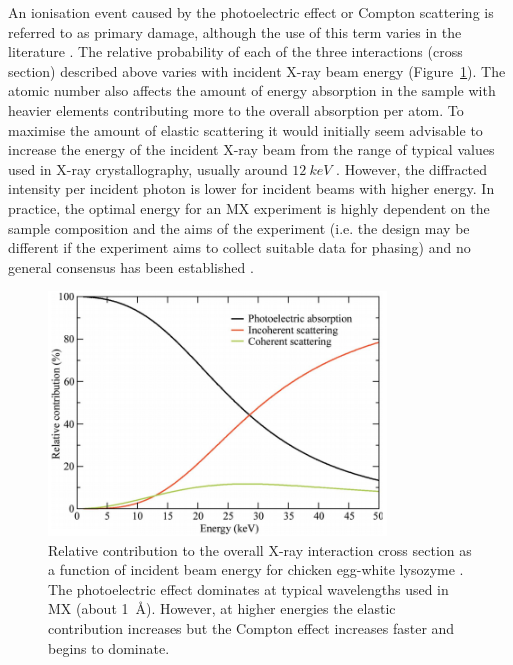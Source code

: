         An ionisation event caused by the photoelectric effect or Compton scattering is referred to as primary damage, although the use of this term varies in the literature \cite{garman2010}.
        The relative probability of each of the three interactions (cross section) described above varies with incident X-ray beam energy (Figure~\ref{fig:Relative Absorption Probabilities}).
        The atomic number also affects the amount of energy absorption in the sample with heavier elements contributing more to the overall absorption per atom.
        To maximise the amount of elastic scattering it would initially seem advisable to increase the energy of the incident X-ray beam from the range of typical values used in X-ray crystallography, usually around $12\ keV$ \cite{pait2010}.
        However, the diffracted intensity per incident photon is lower for incident beams with higher energy.
        In practice, the optimal energy for an MX experiment is highly dependent on the sample composition and the aims of the experiment (i.e. the design may be different if the experiment aims to collect suitable data for phasing) and no general consensus has been established \cite{pait2010}.
        \begin{figure}
            \centering
            \includegraphics[width=0.8\textwidth]{figures/introduction/relativeinteractions.png}
            \caption{Relative contribution to the overall X-ray interaction cross section as a function of incident beam energy for chicken egg-white lysozyme \cite{pait2010}.
            The photoelectric effect dominates at typical wavelengths used in MX (about 1\ \AA).
            However, at higher energies the elastic contribution increases but the Compton effect increases faster and begins to dominate.}
            \label{fig:Relative Absorption Probabilities}
        \end{figure}

